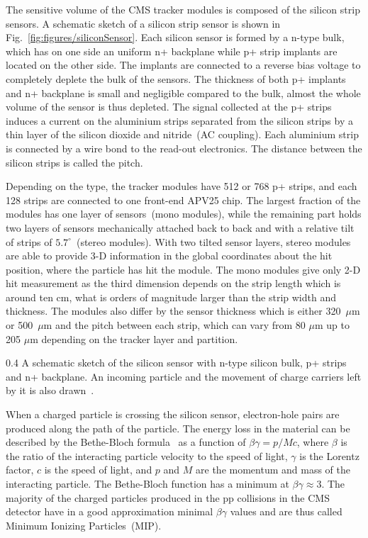 The sensitive volume of the CMS tracker modules is composed of the silicon strip sensors. A schematic sketch of a silicon strip sensor is shown in Fig.~\ref{fig:figures/siliconSensor}. Each silicon sensor is formed by a n-type bulk, which has on one side an uniform n+ backplane while p+ strip implants are located on the other side. The implants are connected to a reverse bias voltage to completely deplete the bulk of the sensors. The thickness of both p+ implants and n+ backplane is small and negligible compared to the bulk, almost the whole volume of the sensor is thus depleted. The signal collected at the p+ strips induces a current on the aluminium strips separated from the silicon strips by a thin layer of the silicon dioxide and nitride~(AC coupling). Each aluminium strip is connected by a wire bond to the read-out electronics. The distance between the silicon strips is called the pitch.

Depending on the type, the tracker modules have 512 or 768 p+ strips, and each 128 strips are connected to one front-end APV25 chip. The largest fraction of the modules has one layer of sensors~(mono modules), while the remaining part holds two layers of sensors  mechanically attached back to back and with a relative tilt of strips of $5.7^{\circ}$~(stereo modules). With two tilted sensor layers, stereo modules are able to provide 3-D information in the global coordinates about the hit position, where the particle has hit the module. The mono modules give only 2-D hit measurement as the third dimension depends on the strip length which is around ten cm, what is orders of magnitude larger than the strip width and thickness. The modules also differ by the sensor thickness which is either 320~$\mu$m or 500~$\mu$m and the pitch between each strip, which can vary from 80 $\mu$m up to 205 $\mu$m depending on the tracker layer and partition.

                 {0.4}       %
                 {A schematic sketch of the silicon sensor with n-type silicon bulk, p+ strips and n+ backplane. An incoming particle and the movement of charge carriers left by it is also drawn~\cite{website:sensor}. } %

When a charged particle is crossing the silicon sensor, electron-hole pairs are produced along the path of the particle. The energy loss in the material can be described by the Bethe-Bloch formula~\cite{Groom:2000sm} as a function of $\beta\gamma = p/Mc$, where $\beta$ is the ratio of the interacting particle velocity to the speed of light, $\gamma$ is the Lorentz factor, $c$ is the speed of light, and $p$ and $M$ are the momentum and mass of the interacting particle. The Bethe-Bloch function has a minimum at $\beta\gamma \approx 3$. The majority of the charged particles produced in the pp collisions in the CMS detector have in a good approximation minimal $\beta\gamma$ values and are thus called Minimum Ionizing Particles~(MIP).

